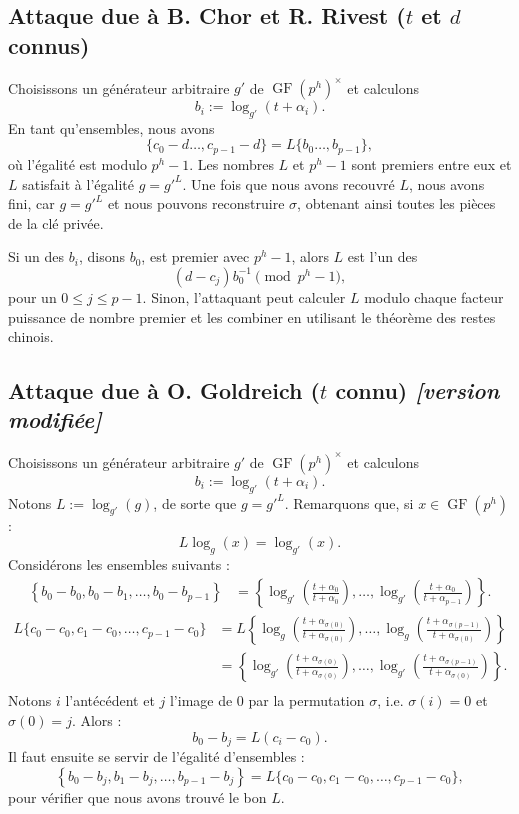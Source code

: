 \documentclass[a4paper, titlepage]{article}
\theoremstyle{definition}
\theoremstyle{remark}
\def\gf{\operatorname{GF}}
\begin{document}
\subsection{Attaque due à B. Chor et R. Rivest ($t$ et $d$ connus)}\label{attaqueTDconnus}

Choisissons un générateur arbitraire $g'$ de $\gf(p^h)^\times$ et calculons $$b_i := \log_{g'}(t+\alpha_i).$$
En tant qu'ensembles, nous avons
$$\{c_0 - d \dots, c_{p-1} -d\} = L\{b_0 \dots, b_{p-1}\},$$
où l'égalité est modulo $p^h -1$. Les nombres $L$ et $p^h-1$ sont premiers entre eux et $L$ satisfait à l'égalité $g = g'^L$. Une fois que nous avons recouvré $L$, nous avons fini, car $g=g'^L$ et nous pouvons reconstruire $\sigma$, obtenant ainsi toutes les pièces de la clé privée.

Si un des $b_i$, disons $b_0$, est premier avec $p^h-1$, alors $L$ est l'un des $$(d-c_j)b_0^{-1} \pmod{p^h-1},$$ pour un $0 \leqslant j \leqslant p-1$. Sinon, l'attaquant peut calculer $L$ modulo chaque facteur puissance de nombre premier et les combiner en utilisant le théorème des restes chinois.

\subsection{Attaque due à O. Goldreich ($t$ connu) \textit {\small [version modifiée]}} \label{attaqueOG}

Choisissons un générateur arbitraire $g'$ de $\gf(p^h)^\times$ et calculons $$b_i := \log_{g'}(t+\alpha_i).$$
Notons $L := \log_{g'}(g)$, de sorte que $g=g'^L$. Remarquons que, si $x \in \gf(p^h)$ :
$$L\log_{g}(x) = \log_{g'}(x).$$
Considérons les ensembles suivants :
\begin{align*}
\left\{b_0 - b_0, b_0 - b_1, \dots, b_0 - b_{p-1}\right\} &= \left\{\log_{g'}\left(\frac{t+\alpha_0}{t+\alpha_0}\right), \dots, \log_{g'}\left(\frac{t+\alpha_0}{t+\alpha_{p-1}}\right)\right\}.
\end{align*}
\begin{align*}
L\{c_0 - c_0, c_1 - c_0, \dots, c_{p-1} -c_0\} &= L\left\{\log_{g}\left(\frac{t+\alpha_{\sigma(0)}}{t+\alpha_{\sigma(0)}}\right), \dots, \log_{g}\left(\frac{t+\alpha_{\sigma(p-1)}}{t+\alpha_{\sigma(0)}}\right)\right\} \\
&= \left\{\log_{g'}\left(\frac{t+\alpha_{\sigma(0)}}{t+\alpha_{\sigma(0)}}\right), \dots, \log_{g'}\left(\frac{t+\alpha_{\sigma(p-1)}}{t+\alpha_{\sigma(0)}}\right)\right\}. \\
\end{align*}
Notons $i$ l’antécédent et $j$ l'image de $0$ par la permutation $\sigma$, i.e. $\sigma(i) = 0$ et $\sigma(0) = j$. Alors :
$$b_0 - b_j = L(c_i-c_0).$$
Il faut ensuite se servir de l'égalité d'ensembles :
$$\left\{b_0 - b_j, b_1 - b_j, \dots, b_{p-1} - b_j\right\} = L\{c_0 - c_0, c_1 - c_0, \dots, c_{p-1} -c_0\},$$
pour vérifier que nous avons trouvé le bon $L$.
\end{document}
